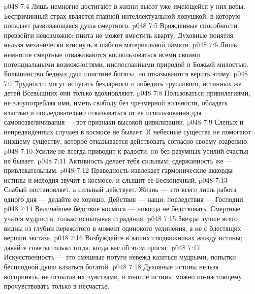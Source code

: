 \vs p048 7:4 \pc {}\bibnobreakspace Лишь немногие достигают в жизни высот уже имеющейся у них веры. Беспричинный страх является главной интеллектуальной ловушкой, в которую попадает развивающаяся душа смертного.
\vs p048 7:5 \pc {}\bibnobreakspace Врожденные способности превзойти невозможно; пинта не может вместить кварту. Духовные понятия нельзя механически втиснуть в шаблон материальной памяти.
\vs p048 7:6 \pc {}\bibnobreakspace Лишь немногие смертные отваживаются воспользоваться всеми своими потенциальными возможностями, ниспосланными природой и Божьей милостью. Большинство бедных душ поистине богаты, но отказываются верить этому.
\vs p048 7:7 \pc {}\bibnobreakspace Трудности могут испугать бездарного и победить трусливого, истинных же детей Всевышних они только вдохновляют.
\vs p048 7:8 \pc {}\bibnobreakspace Пользоваться привилегиями, не злоупотребляя ими, иметь свободу без чрезмерной вольности, обладать властью и последовательно отказываться от ее использования для самовозвеличивания --- вот признаки высокой цивилизации.
\vs p048 7:9 \pc {}\bibnobreakspace Слепых и непредвиденных случаев в космосе не бывает. И небесные существа не помогают низшему существу, которое отказывается действовать согласно своему озарению.
\vs p048 7:10 \pc {}\bibnobreakspace Усилие не всегда приводит к радости, но без разумных усилий счастья не бывает.
\vs p048 7:11 \pc {}\bibnobreakspace Активность делает тебя сильным; сдержанность же --- привлекательным.
\vs p048 7:12 \pc {}\bibnobreakspace Праведность извлекает гармонические аккорды истины и мелодия звучит в космосе, и слышит ее Бесконечный.
\vs p048 7:13 \pc {}\bibnobreakspace Слабый постановляет, а сильный действует. Жизнь --- это всего лишь работа одного дня --- делайте ее хорошо. Действия --- наши; последствия --- Господни.
\vs p048 7:14 \pc {}\bibnobreakspace Величайшее бедствие космоса --- никогда не бедствовать. Смертные учатся мудрости, только испытывая страдания.
\vs p048 7:15 \pc {}\bibnobreakspace Звезды лучше всего видны из глубин пережитого в момент одинокого уединения, а не с блестящих вершин экстаза.
\vs p048 7:16 \pc {}\bibnobreakspace Возбуждайте в ваших сподвижниках жажду истины; давайте советы только тогда, когда вас об этом просят.
\vs p048 7:17 \pc {}\bibnobreakspace Искусственность --- это смешные потуги невежд казаться мудрыми, попытки бесплодной души казаться богатой.
\vs p048 7:18 \pc {}\bibnobreakspace Духовные истины нельзя воспринять, не испытав их чувствами, и многие истины можно по\hyp{}настоящему прочувствовать только в несчастье.

